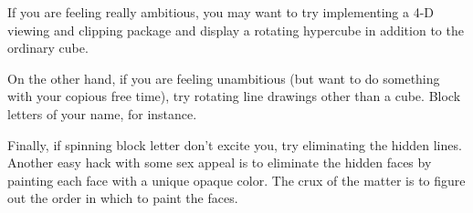 If you are feeling really ambitious, you may want to try implementing
a 4-D viewing and clipping package and display a rotating hypercube
in addition to the ordinary cube.

On the other hand, if you are feeling unambitious (but want to do 
something with your copious free time), try rotating line drawings 
other than a cube. Block letters of your name, for instance. 

Finally, if spinning block letter don't excite you, try eliminating 
the hidden lines. Another easy hack with some sex appeal is to 
eliminate the hidden faces by painting each face with a unique opaque 
color. The crux of the matter is to figure out the order in which 
to paint the faces.




